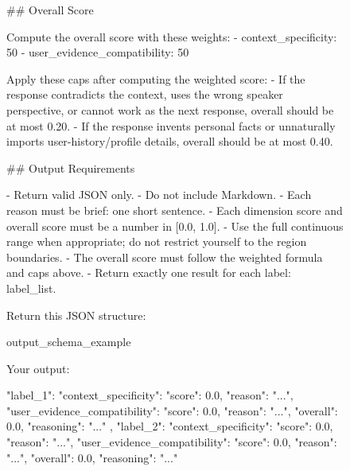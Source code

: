 \begin{figure}[p]
\centering

\begin{promptbox}
## Overall Score

Compute the overall score with these weights:
- context_specificity: 50%
- user_evidence_compatibility: 50%

Apply these caps after computing the weighted score:
- If the response contradicts the context, uses the wrong speaker perspective, or cannot work as the next response, overall should be at most 0.20.
- If the response invents personal facts or unnaturally imports user-history/profile details, overall should be at most 0.40.


## Output Requirements

- Return valid JSON only.
- Do not include Markdown.
- Each reason must be brief: one short sentence.
- Each dimension score and overall score must be a number in [0.0, 1.0].
- Use the full continuous range when appropriate; do not restrict yourself to the region boundaries.
- The overall score must follow the weighted formula and caps above.
- Return exactly one result for each label: {label_list}.

Return this JSON structure:

{output_schema_example}

Your output:
\end{promptbox}
\end{figure}

\begin{figure}[p]
\centering
\begin{promptbox}
{
  "label_1": {
    "context_specificity": {"score": 0.0, "reason": "..."},
    "user_evidence_compatibility": {"score": 0.0, "reason": "..."},
    "overall": 0.0,
    "reasoning": "..."
  },
  "label_2": {
    "context_specificity": {"score": 0.0, "reason": "..."},
    "user_evidence_compatibility": {"score": 0.0, "reason": "..."},
    "overall": 0.0,
    "reasoning": "..."
  }
}
\end{promptbox}
\end{figure}
